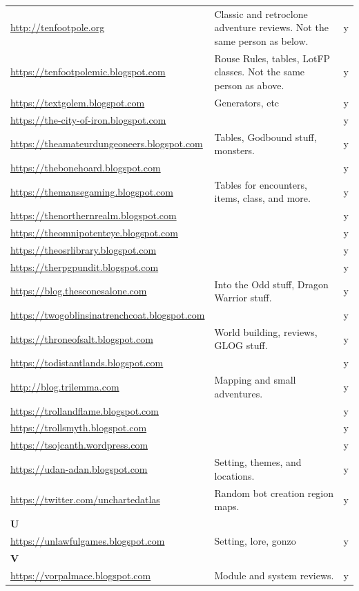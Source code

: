 \documentclass[a4paper, 11pt, twoside]{article}
\begin{document}
\begin{longtable}{p{6cm}p{8cm}c}
\url{http://tenfootpole.org} & Classic and retroclone adventure reviews. Not the same person as below. & y\\
\url{https://tenfootpolemic.blogspot.com} & Rouse Rules, tables, LotFP classes. Not the same person as above. & y\\
\url{https://textgolem.blogspot.com} & Generators, etc & y\\
\url{https://the-city-of-iron.blogspot.com} &  & y\\
\url{https://theamateurdungeoneers.blogspot.com} & Tables, Godbound stuff, monsters. & y\\
\url{https://thebonehoard.blogspot.com} &  & y\\
\url{https://themansegaming.blogspot.com} & Tables for encounters, items, class, and more. & y\\
\url{https://thenorthernrealm.blogspot.com} &  & y\\
\url{https://theomnipotenteye.blogspot.com} &  & y\\
\url{https://theosrlibrary.blogspot.com} &  & y\\
\url{https://therpgpundit.blogspot.com} &  & y\\
\url{https://blog.thesconesalone.com} & Into the Odd stuff, Dragon Warrior stuff. & y\\
\url{https://twogoblinsinatrenchcoat.blogspot.com} &  & y\\
\url{https://throneofsalt.blogspot.com} & World building, reviews, GLOG stuff. & y\\
\url{https://todistantlands.blogspot.com} &  & y\\
\url{http://blog.trilemma.com} & Mapping and small adventures. & y\\
\url{https://trollandflame.blogspot.com} &  & y\\
\url{https://trollsmyth.blogspot.com} &  & y\\
\url{https://tsojcanth.wordpress.com} &  & y\\
\url{https://udan-adan.blogspot.com} & Setting, themes, and locations. & y\\
\url{https://twitter.com/unchartedatlas} & Random bot creation region maps. & y\\
\textbf{U} &  & \\
\url{https://unlawfulgames.blogspot.com} & Setting, lore, gonzo & y\\
\textbf{V} &  & \\
\url{https://vorpalmace.blogspot.com} & Module and system reviews. & y\\

\end{longtable}
\end{document}
